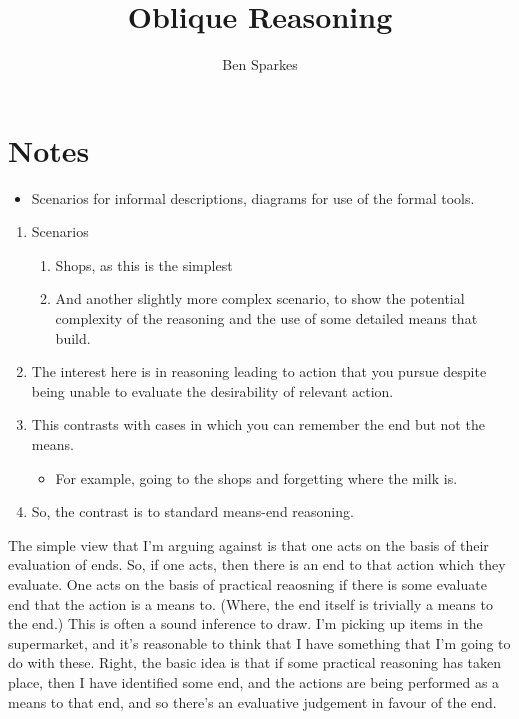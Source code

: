 \documentclass[10pt]{article}
\title{Oblique Reasoning}
\author{Ben Sparkes}
\begin{document}
\section*{Notes}



\begin{itemize}
\item Scenarios for informal descriptions, diagrams for use of the formal tools.
\end{itemize}

\newpage

\begin{enumerate}
\item Scenarios
  \begin{enumerate}
  \item Shops, as this is the simplest
  \item And another slightly more complex scenario, to show the potential complexity of the reasoning and the use of some detailed means that build.
  \end{enumerate}
\item The interest here is in reasoning leading to action that you pursue despite being unable to evaluate the desirability of relevant action.
\item This contrasts with cases in which you can remember the end but not the means.
  \begin{itemize}
  \item For example, going to the shops and forgetting where the milk is.
  \end{itemize}
\item So, the contrast is to standard means-end reasoning.
\end{enumerate}



The simple view that I'm arguing against is that one acts on the basis of their evaluation of ends.
So, if one acts, then there is an end to that action which they evaluate.
One acts on the basis of practical reaosning if there is some evaluate end that the action is a means to.
(Where, the end itself is trivially a means to the end.)
This is often a sound inference to draw.
I'm picking up items in the supermarket, and it's reasonable to think that I have something that I'm going to do with these.
Right, the basic idea is that if some practical reasoning has taken place, then I have identified some end, and the actions are being performed as a means to that end, and so there's an evaluative judgement in favour of the end.
\end{document}
